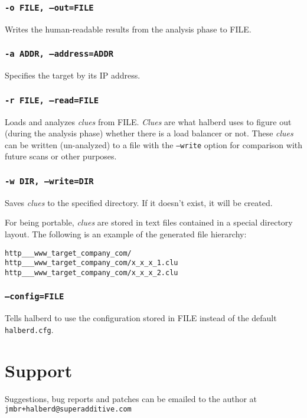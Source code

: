 \documentclass[a4paper]{book}
\begin{document}
\subsection{\texttt{-o FILE, --out=FILE}}

Writes the human-readable results from the analysis phase to FILE.

\subsection{\texttt{-a ADDR, --address=ADDR}}

Specifies the target by its IP address.

\subsection{\texttt{-r FILE, --read=FILE}}

\label{sec:read}
Loads and analyzes \emph{clues} from FILE.  \emph{Clues} are what halberd uses
to figure out (during the analysis phase) whether there is a load balancer or
not.  These \emph{clues} can be written (un-analyzed) to a file with the
\texttt{--write} option for comparison with future scans or other purposes.

\subsection{\texttt{-w DIR, --write=DIR}}

\label{sec:write}
Saves \emph{clues} to the specified directory.  If it doesn't exist, it will be
created.

For being portable, \emph{clues} are stored in text files contained in a
special directory layout.  The following is an example of the generated file
hierarchy:

\begin{verbatim}
http___www_target_company_com/
http___www_target_company_com/x_x_x_1.clu
http___www_target_company_com/x_x_x_2.clu
\end{verbatim}

\subsection{\texttt{--config=FILE}}

Tells halberd to use the configuration stored in FILE instead of the default
\verb|halberd.cfg|.

\chapter{Support}

Suggestions, bug reports and patches can be emailed to the author at
\texttt{jmbr+halberd@superadditive.com}
\end{document}
